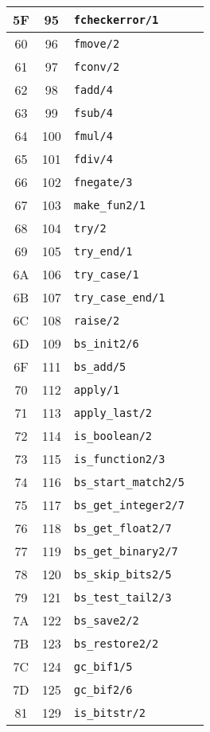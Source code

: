 \begin{longtable}{|c|c|p{5cm}|p{7cm}|}
\hline
5F & 95 & \texttt{fcheckerror/1} & \\
\hline
60 & 96 & \texttt{fmove/2} & \\
\hline
61 & 97 & \texttt{fconv/2} & \\
\hline
62 & 98 & \texttt{fadd/4} & \\
\hline
63 & 99 & \texttt{fsub/4} & \\
\hline
64 & 100 & \texttt{fmul/4} & \\
\hline
65 & 101 & \texttt{fdiv/4} & \\
\hline
66 & 102 & \texttt{fnegate/3} & \\
\hline
67 & 103 & \texttt{make\_fun2/1} & \\
\hline
68 & 104 & \texttt{try/2} & \\
\hline
69 & 105 & \texttt{try\_end/1} & \\
\hline
6A & 106 & \texttt{try\_case/1} & \\
\hline
6B & 107 & \texttt{try\_case\_end/1} & \\
\hline
6C & 108 & \texttt{raise/2} & \\
\hline
6D & 109 & \texttt{bs\_init2/6} & \\
\hline
6F & 111 & \texttt{bs\_add/5} & \\
\hline
70 & 112 & \texttt{apply/1} & \\
\hline
71 & 113 & \texttt{apply\_last/2} & \\
\hline
72 & 114 & \texttt{is\_boolean/2} & \\
\hline
73 & 115 & \texttt{is\_function2/3} & \\
\hline
74 & 116 & \texttt{bs\_start\_match2/5} & \\
\hline
75 & 117 & \texttt{bs\_get\_integer2/7} & \\
\hline
76 & 118 & \texttt{bs\_get\_float2/7} & \\
\hline
77 & 119 & \texttt{bs\_get\_binary2/7} & \\
\hline
78 & 120 & \texttt{bs\_skip\_bits2/5} & \\
\hline
79 & 121 & \texttt{bs\_test\_tail2/3} & \\
\hline
7A & 122 & \texttt{bs\_save2/2} & \\
\hline
7B & 123 & \texttt{bs\_restore2/2} & \\
\hline
7C & 124 & \texttt{gc\_bif1/5} & \\
\hline
7D & 125 & \texttt{gc\_bif2/6} & \\
\hline
81 & 129 & \texttt{is\_bitstr/2} & \\

\end{longtable}
